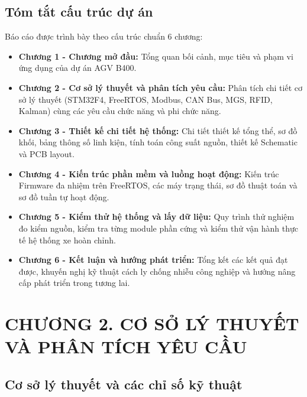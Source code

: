 \documentclass{article}
\begin{document}
\subsection{Tóm tắt cấu trúc dự án}
Báo cáo được trình bày theo cấu trúc chuẩn 6 chương:
\begin{itemize}
    \item \textbf{Chương 1 - Chương mở đầu:} Tổng quan bối cảnh, mục tiêu và phạm vi ứng dụng của dự án AGV B400.
    \item \textbf{Chương 2 - Cơ sở lý thuyết và phân tích yêu cầu:} Phân tích chi tiết cơ sở lý thuyết (STM32F4, FreeRTOS, Modbus, CAN Bus, MGS, RFID, Kalman) cùng các yêu cầu chức năng và phi chức năng.
    \item \textbf{Chương 3 - Thiết kế chi tiết hệ thống:} Chi tiết thiết kế tổng thể, sơ đồ khối, bảng thông số linh kiện, tính toán công suất nguồn, thiết kế Schematic và PCB layout.
    \item \textbf{Chương 4 - Kiến trúc phần mềm và luồng hoạt động:} Kiến trúc Firmware đa nhiệm trên FreeRTOS, các máy trạng thái, sơ đồ thuật toán và sơ đồ tuần tự hoạt động.
    \item \textbf{Chương 5 - Kiểm thử hệ thống và lấy dữ liệu:} Quy trình thử nghiệm đo kiểm nguồn, kiểm tra từng module phần cứng và kiểm thử vận hành thực tế hệ thống xe hoàn chỉnh.
    \item \textbf{Chương 6 - Kết luận và hướng phát triển:} Tổng kết các kết quả đạt được, khuyến nghị kỹ thuật cách ly chống nhiễu công nghiệp và hướng nâng cấp phát triển trong tương lai.
\end{itemize}

\newpage

\clearpage
\section*{CHƯƠNG 2. CƠ SỞ LÝ THUYẾT VÀ PHÂN TÍCH YÊU CẦU}
\setcounter{section}{2}
\setcounter{subsection}{0}
\setcounter{figure}{0}
\setcounter{table}{0}

\subsection{Cơ sở lý thuyết và các chỉ số kỹ thuật}
\end{document}
